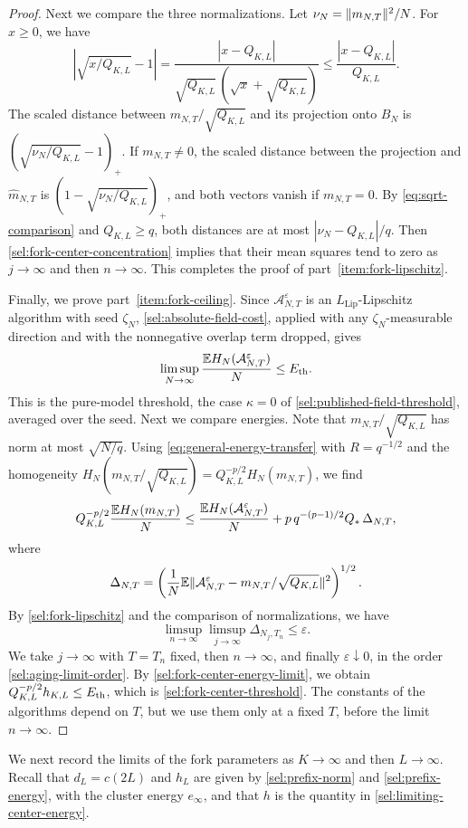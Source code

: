 \begin{proof}
Next we compare the three normalizations. Let
$\nu_N=\lVert m_{N,T}\rVert^2/N$. For $x\ge0$, we have
\begin{equation}\label{eq:sqrt-comparison}
 \left|\sqrt{x/Q_{K,L}}-1\right|
 =\frac{|x-Q_{K,L}|}{\sqrt{Q_{K,L}}\,(\sqrt x+\sqrt{Q_{K,L}})}
 \le\frac{|x-Q_{K,L}|}{Q_{K,L}}.
\end{equation}
The scaled distance between $m_{N,T}/\sqrt{Q_{K,L}}$ and its projection
onto $B_N$ is $(\sqrt{\nu_N/Q_{K,L}}-1)_+$. If $m_{N,T}\ne0$, the scaled
distance between the projection and $\widehat m_{N,T}$ is
$(1-\sqrt{\nu_N/Q_{K,L}})_+$, and both vectors vanish if $m_{N,T}=0$. By
\eqref{eq:sqrt-comparison} and $Q_{K,L}\ge q$, both distances are at most
$|\nu_N-Q_{K,L}|/q$. Then \eqref{sel:fork-center-concentration} implies that
their mean squares tend to zero as $j\to\infty$ and then $n\to\infty$. This completes
the proof of part~\ref{item:fork-lipschitz}.

Finally, we prove part~\ref{item:fork-ceiling}. Since
$\mathcal A^\varepsilon_{N,T}$ is an $L_{\mathrm{Lip}}$-Lipschitz algorithm with seed
$\zeta_N$, \cref{sel:absolute-field-cost}, applied with any
$\zeta_N$-measurable direction and with the nonnegative overlap term
dropped, gives
\[
 \limsup_{N\to\infty}\frac{\mathbb E H_N(\mathcal A^\varepsilon_{N,T})}N\le E_{\mathrm{th}}.
\]
This is the pure-model threshold, the case $\kappa=0$ of
\cref{sel:published-field-threshold}, averaged over the seed. Next we
compare energies. Note that $m_{N,T}/\sqrt{Q_{K,L}}$ has norm at most
$\sqrt{N/q}$. Using \eqref{eq:general-energy-transfer} with $R=q^{-1/2}$ and
the homogeneity $H_N(m_{N,T}/\sqrt{Q_{K,L}})=Q_{K,L}^{-p/2}H_N(m_{N,T})$, we
find
\[
 Q_{K,L}^{-p/2}\frac{\mathbb E H_N(m_{N,T})}N
 \le\frac{\mathbb E H_N(\mathcal A^\varepsilon_{N,T})}N
 +p\,q^{-(p-1)/2}Q_*\,\Delta_{N,T},
\]
where
\[
 \Delta_{N,T}=\left(\frac1N\mathbb E\lVert\mathcal A^\varepsilon_{N,T}
 -m_{N,T}/\sqrt{Q_{K,L}}\rVert^2\right)^{1/2}.
\]
By \eqref{sel:fork-lipschitz} and the comparison of normalizations, we have
\[
 \limsup_{n\to\infty}\limsup_{j\to\infty}\Delta_{N_j,T_n}\le\varepsilon.
\]
We take
$j\to\infty$ with $T=T_n$ fixed, then $n\to\infty$, and finally
$\varepsilon\downarrow0$, in the order \eqref{sel:aging-limit-order}. By
\eqref{sel:fork-center-energy-limit}, we obtain
$Q_{K,L}^{-p/2}h_{K,L}\le E_{\mathrm{th}}$, which is \eqref{sel:fork-center-threshold}.
The constants of the algorithms depend on $T$, but we use them only at a
fixed $T$, before the limit $n\to\infty$.
\end{proof}

We next record the limits of the fork parameters as $K\to\infty$ and then
$L\to\infty$. Recall that $d_L=c(2L)$ and $h_L$ are given by
\eqref{sel:prefix-norm} and \eqref{sel:prefix-energy}, with the cluster
energy $e_\infty$, and that $h$ is the quantity in
\eqref{sel:limiting-center-energy}.

